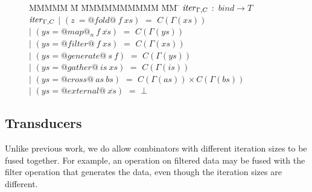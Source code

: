 \begin{figure}[H]
\begin{tabbing}
MMMMM \= M \= MMMMMMMMMM \= MM \= \kill
$\mathit{iter}_{\Gamma,C}$  
        \>$:$\> $bind \rightarrow T$ 
\\[1ex]
$\mathit{iter}_{\Gamma,C}$
        \> $|$  \> $(z~ = @fold@~ f~xs)$     
                \> $=$ \> $C(\Gamma(xs))$ 
\\
        \> $|$  \> $(ys = @map@_n~f~\overline{xs})$
                \> $=$ \> $C(\Gamma(ys))$ 
\\
        \> $|$  \> $(ys = @filter@~f~xs)$    
                \> $=$ \> $C(\Gamma(xs))$ 
\\
        \> $|$  \> $(ys = @generate@~s~f)$  
                \> $=$ \> $C(\Gamma(ys))$ 
\\
        \> $|$  \> $(ys = @gather@~is~xs)$    
                \> $=$ \> $C(\Gamma(is))$ 
\\
        \> $|$  \> $(ys = @cross@~as~bs)$     
                \> $=$ \> $C(\Gamma(as)) \times C(\Gamma(bs))$ 
\\
        \> $|$  \> $(ys = @external@~\overline{xs})$  
                \> $=$ \> $\bot$ 
\\
\end{tabbing}
\end{figure}





\subsection{Transducers}
Unlike previous work, we do allow combinators with different iteration sizes to be fused together.
For example, an operation on filtered data may be fused with the filter operation that generates the data, even though the iteration sizes are different.

